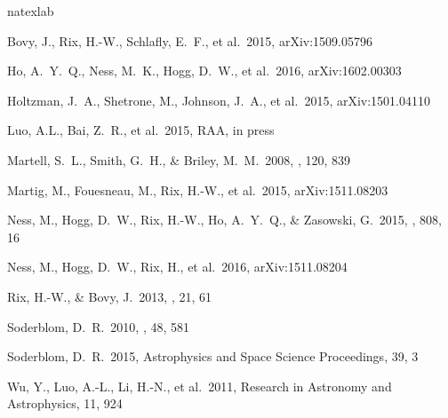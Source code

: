 \documentclass[12pt, preprint]{aastex}
\begin{document}
\begin{thebibliography}{24}
\expandafter\ifx\csname natexlab\endcsname\relax\def\natexlab#1{#1}\fi

 Bovy, J., Rix, H.-W., 
Schlafly, E.~F., et al.\ 2015, arXiv:1509.05796 

 Ho, A.~Y.~Q., Ness, M.~K., 
Hogg, D.~W., et al.\ 2016, arXiv:1602.00303 

 Holtzman, J.~A., 
Shetrone, M., Johnson, J.~A., et al.\ 2015, arXiv:1501.04110 

 Luo, A.L., Bai, Z.~R., et al.\ 2015, RAA, in press

 Martell, S.~L., Smith, 
G.~H., \& Briley, M.~M.\ 2008, \pasp, 120, 839 

 Martig, M., Fouesneau, M., Rix, H.-W., et al.\ 2015, arXiv:1511.08203 

 Ness, M., Hogg, D.~W., 
Rix, H.-W., Ho, A.~Y.~Q., \& Zasowski, G.\ 2015, \apj, 808, 16 

 Ness, M., Hogg, D.~W., 
Rix, H., et al.\ 2016, arXiv:1511.08204 

 Rix, H.-W., \& Bovy, J.\ 2013, \aapr, 21, 61 

 Soderblom, D.~R.\ 2010, \araa, 48, 581 

 Soderblom, D.~R.\ 2015, 
Astrophysics and Space Science Proceedings, 39, 3 

 Wu, Y., Luo, A.-L., Li, 
H.-N., et al.\ 2011, Research in Astronomy and Astrophysics, 11, 924 

\end{thebibliography}
\end{document}

